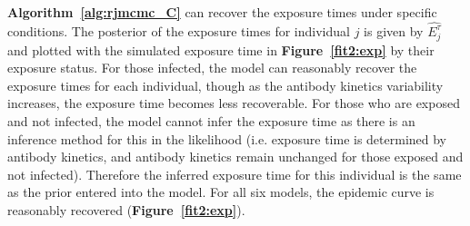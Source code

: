 \paragraph{} \textbf{Algorithm~\ref{alg:rjmcmc_C}} can recover the exposure times under specific conditions. The posterior of the exposure times for individual $j$ is given by $\hat{E^\tau_j}$ and plotted with the simulated exposure time in \textbf{Figure~\ref{fit2:exp} } by their exposure status. For those infected, the model can reasonably recover the exposure times for each individual, though as the antibody kinetics variability increases, the exposure time becomes less recoverable. For those who are exposed and not infected, the model cannot infer the exposure time as there is an inference method for this in the likelihood (i.e. exposure time is determined by antibody kinetics, and antibody kinetics remain unchanged for those exposed and not infected). Therefore the inferred exposure time for this individual is the same as the prior entered into the model. For all six models, the epidemic curve is reasonably recovered (\textbf{Figure~\ref{fit2:exp}}).

